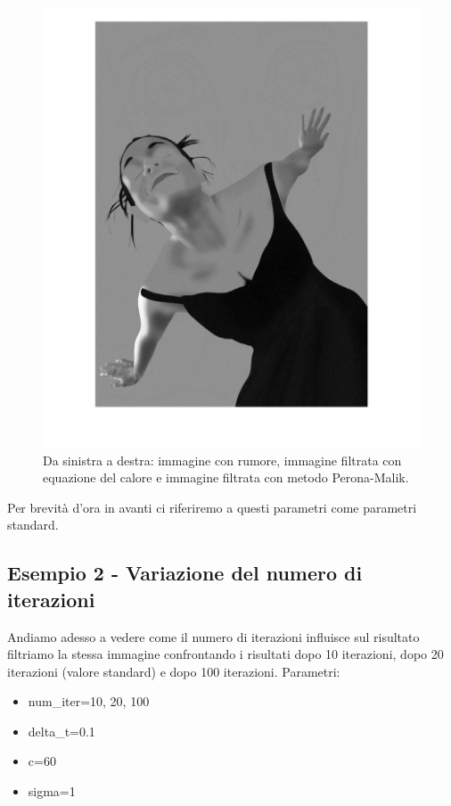 \begin{figure}[htb]
\includegraphics[scale=0.13,trim={4.5cm 0 6cm 0},clip]{Pictures/Esempi di utilizzo/Esempio 1/Amira_filtrata.png}
\caption{Da sinistra a destra: immagine con rumore, immagine filtrata con equazione del calore e immagine filtrata con metodo Perona-Malik.}\label{fig:figura}
\end{figure} 
Per brevità d'ora in avanti ci riferiremo a questi parametri come parametri standard.

\newpage
\subsection{Esempio 2 - Variazione del numero di iterazioni}
Andiamo adesso a vedere come il numero di iterazioni influisce sul risultato\\
filtriamo la stessa immagine confrontando i risultati dopo 10 iterazioni, dopo 20 iterazioni (valore standard) e dopo 100 iterazioni.
Parametri:
\begin{itemize}
    \item num\_iter=10, 20, 100
    \item delta\_t=0.1
    \item c=60
    \item sigma=1
\end{itemize}

